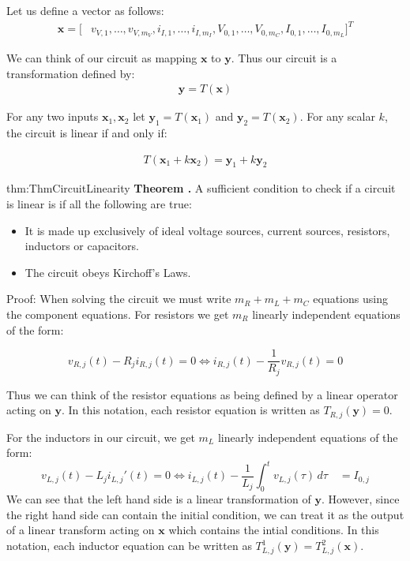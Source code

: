\documentclass[14pt,a5paper,twoside]{book}
\newenvironment{myTheorem}[2]{ \begin{Theorem}[adjusted title=#1]{}{#2} 
  \textbf{Theorem \thetcbcounter.} \label{#2}}{\end{Theorem}}
\begin{document}
Let us define a vector as follows:
\begin{align*}
\mathbf{x} = [ &v_{V,1}, \ldots ,v_{V,m_V}, i_{I,1}, \ldots ,i_{I,m_I}, V_{0,1}, \ldots , V_{0,m_C}, I_{0,1}, \ldots, I_{0,m_L}]^T
\end{align*}

We can think of our circuit as mapping $\mathbf{x}$ to $\mathbf{y}$. Thus our circuit is a transformation defined by:
\begin{align*}
\mathbf{y} = T(\mathbf{x})
\end{align*}

For any two inputs $\mathbf{x}_1,\mathbf{x}_2$ let $\mathbf{y}_1 = T(\mathbf{x}_1)$ and $\mathbf{y}_2 = T(\mathbf{x}_2)$. For any scalar $k$, the circuit is linear if and only if:

\begin{align*}
T(\mathbf{x}_1 + k \mathbf{x}_2) = \mathbf{y}_1 + k \mathbf{y}_2
\end{align*}


\begin{myTheorem}{Circuit Linearity}{thm:ThmCircuitLinearity}
	A sufficient condition to check if a circuit is linear is if all the following are true:
	\begin{itemize}
		\item{It is made up exclusively of ideal voltage sources, current sources, resistors, inductors or capacitors.}
		\item{The circuit obeys Kirchoff's Laws.}
	\end{itemize}
\end{myTheorem}

Proof: When solving the circuit we must write $m_R + m_L + m_C$ equations using the component equations. For resistors we get $m_R$ linearly independent equations of the form:

$$
v_{R,j}(t) - R_j i_{R,j}(t) = 0 \iff i_{R,j}(t) - \frac{1}{R_j} v_{R,j}(t) = 0
$$

Thus we can think of the resistor equations as being defined by a linear operator acting on $\mathbf{y}$. In this notation, each resistor equation is written as $T_{R,j} (\mathbf{y}) = 0$.

For the inductors in our circuit, we get $m_L$ linearly independent equations of the form:
$$
v_{L,j}(t) - L_j i_{L,j}'(t) = 0 \iff i_{L,j}(t) - \frac{1}{L_j}\int_0^t v_{L,j}(\tau)\,d\tau\quad = I_{0,j}
$$
We can see that the left hand side is a linear transformation of $\mathbf{y}$. However, since the right hand side can contain the initial condition, we can treat it as the output of a linear transform acting on $\mathbf{x}$ which contains the intial conditions. In this notation, each inductor equation can be written as $T_{L,j}^1 (\mathbf{y}) = T_{L,j}^2 (\mathbf{x})$.
\end{document}
